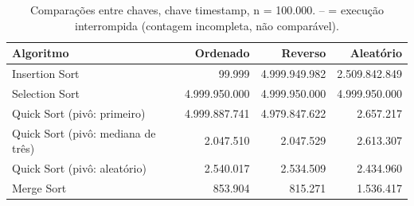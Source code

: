 \begin{table}[ht]
\centering
\caption{Compara\c{c}\~oes entre chaves, chave timestamp, n = 100.000. -- = execu\c{c}\~ao interrompida (contagem incompleta, n\~ao compar\'avel).}
\label{tab:comp-timestamp-100000}
\begin{tabular}{lrrr}
\hline
Algoritmo & Ordenado & Reverso & Aleat\'orio \\
\hline
Insertion Sort & 99.999 & 4.999.949.982 & 2.509.842.849 \\
Selection Sort & 4.999.950.000 & 4.999.950.000 & 4.999.950.000 \\
Quick Sort (piv\^o: primeiro) & 4.999.887.741 & 4.979.847.622 & 2.657.217 \\
Quick Sort (piv\^o: mediana de tr\^es) & 2.047.510 & 2.047.529 & 2.613.307 \\
Quick Sort (piv\^o: aleat\'orio) & 2.540.017 & 2.534.509 & 2.434.960 \\
Merge Sort & 853.904 & 815.271 & 1.536.417 \\
\hline
\end{tabular}
\end{table}
